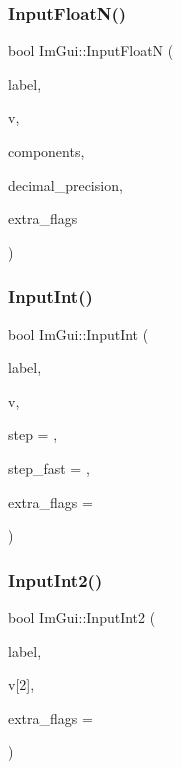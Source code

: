 \mbox{\label{namespace_im_gui_a7fe2c74d1c0042b77d8e6788faed0983}} 
\subsubsection{\texorpdfstring{Input\+Float\+N()}{InputFloatN()}}
{\footnotesize\ttfamily bool Im\+Gui\+::\+Input\+FloatN (\begin{DoxyParamCaption}\item[{const char $\ast$}]{label,  }\item[{float $\ast$}]{v,  }\item[{int}]{components,  }\item[{int}]{decimal\+\_\+precision,  }\item[{\mbox{\hyperlink{imgui_8h_a7d2c6153a6b9b5d3178ce82434ac9fb8}{Im\+Gui\+Input\+Text\+Flags}}}]{extra\+\_\+flags }\end{DoxyParamCaption})}

\mbox{\label{namespace_im_gui_a8b5e9de08c18d6053d2f718b99be94a6}} 
\subsubsection{\texorpdfstring{Input\+Int()}{InputInt()}}
{\footnotesize\ttfamily bool Im\+Gui\+::\+Input\+Int (\begin{DoxyParamCaption}\item[{const char $\ast$}]{label,  }\item[{int $\ast$}]{v,  }\item[{int}]{step = {},  }\item[{int}]{step\+\_\+fast = {},  }\item[{\mbox{\hyperlink{imgui_8h_a7d2c6153a6b9b5d3178ce82434ac9fb8}{Im\+Gui\+Input\+Text\+Flags}}}]{extra\+\_\+flags = {} }\end{DoxyParamCaption})}

\mbox{\label{namespace_im_gui_a4142cc4545d789d76d51dee61c959a03}} 
\subsubsection{\texorpdfstring{Input\+Int2()}{InputInt2()}}
{\footnotesize\ttfamily bool Im\+Gui\+::\+Input\+Int2 (\begin{DoxyParamCaption}\item[{const char $\ast$}]{label,  }\item[{int}]{v\mbox{[}2\mbox{]},  }\item[{\mbox{\hyperlink{imgui_8h_a7d2c6153a6b9b5d3178ce82434ac9fb8}{Im\+Gui\+Input\+Text\+Flags}}}]{extra\+\_\+flags = {} }\end{DoxyParamCaption})}

